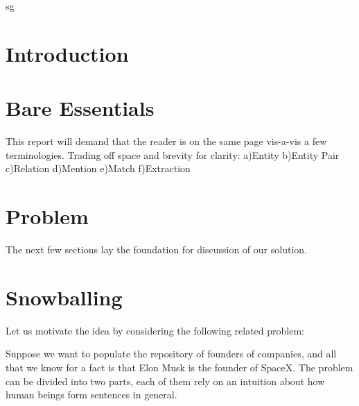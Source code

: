\documentclass[a4paper,10pt]{article}
\title{}
\author{}
\begin{document}
 
sg
\maketitle

\begin{abstract}

\end{abstract}

\section{Introduction}

\section{Bare Essentials}
This report will demand that the reader is on the same page vis-a-vis a few terminologies.
Trading off space and brevity for clarity:
a)Entity
b)Entity Pair
c)Relation
d)Mention
e)Match
f)Extraction

\section{Problem}

The next few sections lay the foundation for discussion of our solution.
  
\section{Snowballing}
Let us motivate the idea by considering the following related problem:

Suppose we want to populate the repository of founders of companies, and all that we know
for a fact is that Elon Musk is the founder of SpaceX.
The problem can be divided into two parts, each of them rely on an intuition about how human 
beings form sentences in general.
\end{document}
